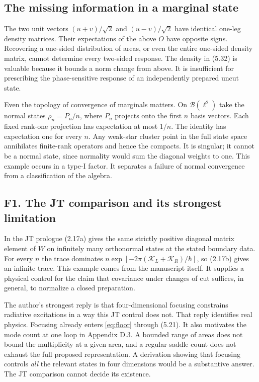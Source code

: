 \documentclass[11pt]{article}
\begin{document}
\subsection{The missing information in a marginal state}
The two unit vectors $(u+v)/\sqrt2$ and $(u-v)/\sqrt2$ have identical one-leg density matrices. Their expectations of the above $O$ have opposite signs. Recovering a one-sided distribution of areas, or even the entire one-sided density matrix, cannot determine every two-sided response. The density in (5.32) is valuable because it bounds a norm change from above. It is insufficient for prescribing the phase-sensitive response of an independently prepared uncut state.

Even the topology of convergence of marginals matters. On $\mathcal B(\ell^2)$ take the normal states $\rho_n=P_n/n$, where $P_n$ projects onto the first $n$ basis vectors. Each fixed rank-one projection has expectation at most $1/n$. The identity has expectation one for every $n$. Any weak-star cluster point in the full state space annihilates finite-rank operators and hence the compacts. It is singular; it cannot be a normal state, since normality would sum the diagonal weights to one. This example occurs in a type-I factor. It separates a failure of normal convergence from a classification of the algebra.

\subsection{F1. The JT comparison and its strongest limitation}
In the JT prologue (2.17a) gives the same strictly positive diagonal matrix element of $W$ on infinitely many orthonormal states at the stated boundary data. For every $n$ the trace dominates $n\exp[-2\pi(\mathcal K_L+\mathcal K_R)/\hbar]$, so (2.17b) gives an infinite trace. This example comes from the manuscript itself. It supplies a physical control for the claim that covariance under changes of cut suffices, in general, to normalize a closed preparation.

The author's strongest reply is that four-dimensional focusing constrains radiative excitations in a way this JT control does not. That reply identifies real physics. Focusing already enters \eqref{eq:floor} through (5.21). It also motivates the mode count at one loop in Appendix D.3. A bounded range of areas does not bound the multiplicity at a given area, and a regular-saddle count does not exhaust the full proposed representation. A derivation showing that focusing controls \emph{all} the relevant states in four dimensions would be a substantive answer. The JT comparison cannot decide its existence.
\end{document}
